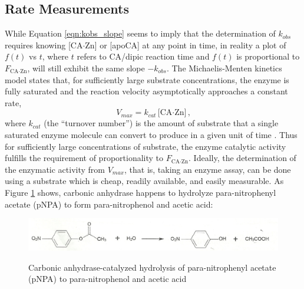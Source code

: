 \subsection{Rate Measurements}
While Equation \eqref{eqn:kobs_slope} seems to imply that the determination of $k_{obs}$ requires knowing [CA$\cdot$Zn] or [apoCA] at any point in time, in reality a plot of $f(t)$ vs $t$, where $t$ refers to CA/dipic reaction time and $f(t)$ is proportional to $F_\text{CA$\cdot$Zn}$, will still exhibit the same slope $-k_{obs}$. The Michaelis-Menten kinetics model states that, for sufficiently large substrate concentrations, the enzyme is fully saturated and the reaction velocity asymptotically approaches a constant rate,
\begin{equation}\label{eqn:vmax}
V_{max}=k_{cat}\text{[CA$\cdot$Zn]}\text{,} 
\end{equation}
where $k_{cat}$ (the ``turnover number'') is the amount of substrate that a single saturated enzyme molecule can convert to produce in a given unit of time \cite{bib:lehninger_mm}. Thus for sufficiently large concentrations of substrate, the enzyme catalytic activity fulfills the requirement of proportionality to $F_\text{CA$\cdot$Zn}$. Ideally, the determination of the enzymatic activity from $V_{max}$, that is, taking an enzyme assay, can be done using a substrate which is cheap, readily available, and easily measurable. As Figure \ref{fig:pnpa_reaction} shows, carbonic anhydrase happens to hydrolyze para-nitrophenyl acetate (pNPA) to form para-nitrophenol and acetic acid:
\begin{figure}[h]
  \includegraphics[width=.9\textwidth]{./Figures/pnpa_hydrolysis.jpg}\\
  \caption{Carbonic anhydrase-catalyzed hydrolysis of para-nitrophenyl acetate (pNPA) to para-nitrophenol and acetic acid \cite{bib:lab_manual}}\label{fig:pnpa_reaction}
\end{figure}

